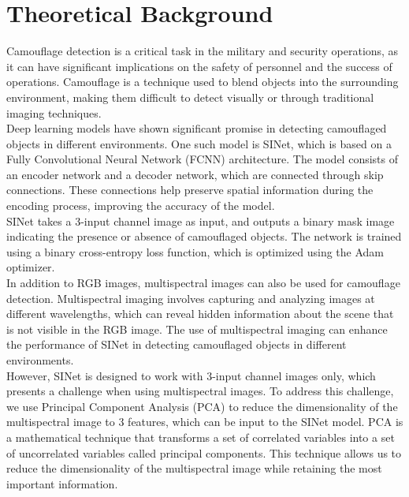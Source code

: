\section{{{\fontsize{17}{21}\selectfont \textbf{Theoretical Background}}}}
\setlength{\columnsep}{1.5cm}
\begin{multicols}{2}

Camouflage detection is a critical task in the military and security operations, as it can have significant implications on the safety of personnel and the success of operations. Camouflage is a technique used to blend objects into the surrounding environment, making them difficult to detect visually or through traditional imaging techniques.\\
Deep learning models have shown significant promise in detecting camouflaged objects in different environments. One such model is SINet, which is based on a Fully Convolutional Neural Network (FCNN)\cite{ai.stackexchange.fullyconvnet} architecture. The model consists of an encoder network and a decoder network, which are connected through skip connections. These connections help preserve spatial information during the encoding process, improving the accuracy of the model.\\
SINet takes a 3-input channel image as input, and outputs a binary mask image indicating the presence or absence of camouflaged objects. The network is trained using a binary cross-entropy loss function, which is optimized using the Adam optimizer.\cite{adam}\\
In addition to RGB\cite{rgb} images, multispectral images\cite{edmundoptics} can also be used for camouflage detection. Multispectral imaging involves capturing and analyzing images at different wavelengths, which can reveal hidden information about the scene that is not visible in the RGB image. The use of multispectral imaging can enhance the performance of SINet in detecting camouflaged objects in different environments.\\
However, SINet is designed to work with 3-input channel images only, which presents a challenge when using multispectral images. To address this challenge, we use Principal Component Analysis (PCA) to reduce the dimensionality of the multispectral image to 3 features, which can be input to the SINet model. PCA is a mathematical technique that transforms a set of correlated variables into a set of uncorrelated variables called principal components. This technique allows us to reduce the dimensionality of the multispectral image while retaining the most important information.\\

\end{multicols}
